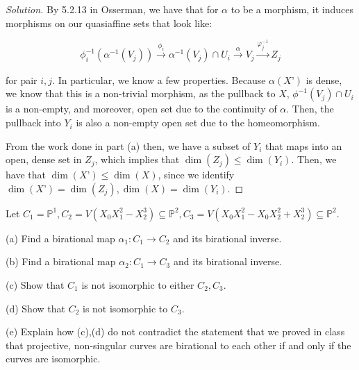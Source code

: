 \documentclass[10pt]{article}
\newenvironment{problem}[2][Problem]{\begin{trivlist}
\item[\hskip \labelsep {\bfseries #1}\hskip \labelsep {\bfseries #2.}]}{\end{trivlist}}
\begin{document}
\begin{proof}[Solution]
By 5.2.13 in Osserman, we have that for $\alpha$ to be a morphism, it induces morphisms on our quasiaffine sets that look like:

$$ \phi_i^{-1}(\alpha^{-1}(V_j)) \xrightarrow[]{\phi_i} \alpha^{-1}(V_j) \cap U_i \xrightarrow[]{\alpha} V_j \xrightarrow[]{\varphi_j^{-1}} Z_j$$

for pair $i,j$. In particular, we know a few properties. Because $\alpha(X’)$ is dense, we know that this is a non-trivial morphism, as the pullback to $X$, $\phi^{-1}(V_j) \cap U_i $ is a non-empty, and moreover, open set due to the continuity of $\alpha$. Then, the pullback into $Y_i$ is also a non-empty open set due to the homeomorphism.

From the work done in part (a) then, we have a subset of $Y_i$ that maps into an open, dense set in $Z_j$, which implies that $\dim(Z_j) \leq \dim(Y_i)$. Then, we have that $\dim(X’) \leq \dim(X)$, since we identify $\dim(X’) = \dim(Z_j), \dim(X) = \dim(Y_i)$.

\end{proof}

\begin{problem}{8.2}

Let $C_1 = \mathbb{P}^1, C_2 = V(X_0 X_1^2 - X_2^3) \subseteq \mathbb{P}^2, C_3 = V(X_0X_1^2  - X_0X_2^2 + X_2^3) \subseteq \mathbb{P}^2$. 

(a) Find a birational map $\alpha_1: C_1 \to C_2$ and its birational inverse.

(b) Find a birational map $\alpha_2: C_1 \to C_3$ and its birational inverse.

(c) Show that $C_1$ is not isomorphic to either $C_2, C_3$.

(d) Show that $C_2$ is not isomorphic to $C_3$.

(e) Explain how (c),(d) do not contradict the statement that we proved in class that projective, non-singular curves are birational to each other if and only if the curves are isomorphic.
\end{problem}
\end{document}
